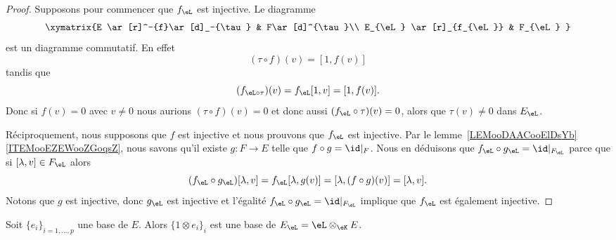 \begin{proof}
    Supposons pour commencer que \( f_{\eL}\) est injective.
    Le diagramme
    \begin{equation}
        \xymatrix{%
            E \ar[r]^-{f}\ar[d]_-{\tau}      &   F\ar[d]^{\tau}\\
            E_{\eL} \ar[r]_{f_{\eL}}  &   F_{\eL}
           }
    \end{equation}
    est un diagramme commutatif. En effet
    \begin{equation}
        (\tau\circ f)(v)=[1,f(v)]
    \end{equation}
    tandis que
    \begin{equation}
        (f_{\eL\circ\tau})(v)=f_{\eL}[1,v]=[1,f(v)].
    \end{equation}
    Donc si \( f(v)=0\) avec \( v\neq 0\) nous aurions \( (\tau\circ f)(v)=0\) et donc aussi \( (f_{\eL}\circ \tau)(v)=0\), alors que \( \tau(v)\neq 0\) dans \( E_{\eL}\).

    Réciproquement, nous supposons que \( f\) est injective et nous prouvons que \( f_{\eL}\) est injective. Par le lemme~\ref{LEMooDAACooElDsYb}\ref{ITEMooEZEWooZGoqsZ}, nous savons qu'il existe \( g\colon F\to E\) telle que \( f\circ g=\id|_F\). Nous en déduisons que \( f_{\eL}\circ g_{\eL}=\id|_{F_{\eL}}\) parce que si \( [\lambda,v]\in F_{\eL}\) alors
    \begin{equation}
        (f_{\eL}\circ g_{\eL})[\lambda,v]=f_{\eL}[\lambda,g(v)]=[\lambda,(f\circ g)(v)]=[\lambda,v].
    \end{equation}
    Notons que \( g\) est injective, donc \( g_{\eL}\) est injective et l'égalité \( f_{\eL}\circ g_{\eL}=\id|_{F_{\eL}} \) implique que \( f_{\eL}\) est également injective.
\end{proof}

\begin{proposition} \label{PROPooMHARooUycAts}
    Soit \( \{ e_i \}_{i=1,\ldots, p}\) une base de \( E\). Alors \( \{ 1\otimes e_i \}_i\) est une base de \( E_{\eL}=\eL\otimes_{\eK}E\).
\end{proposition}

